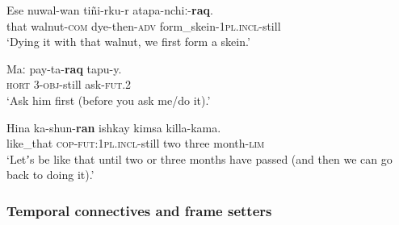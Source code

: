 \begin{exe}
	\ex
	\gll Ese nuwal-wan tiñi-rku-r atapa-nchiː-\textbf{raq}.\\
	that walnut-\textsc{com} dye-then-\textsc{adv} form\_skein-1\textsc{pl}.\textsc{incl}-still\\
	\glt \lq Dying it with that walnut, we first form a skein.' \parencite[388]{Weber1989}
	
	\ex
	\gll Maː pay-ta-\textbf{raq} tapu-y.\\
	\textsc{hort} 3-\textsc{obj}-still ask-\textsc{fut}.2\\
	\glt \lq Ask him first (before you ask me/do it).' \parencite[390]{Weber1989}

	\ex
	\gll Hina ka-shun-\textbf{ran} ishkay kimsa killa-kama.\\
	like\_that \textsc{cop}-\textsc{fut}:1\textsc{pl}.\textsc{incl}-still two three month-\textsc{lim}\\
	\glt \lq Letʼs be like that until two or three months have passed (and then we can go back to doing it).' \parencite[388]{Weber1989}
\end{exe}

\subsubsection{Temporal connectives and frame setters}
